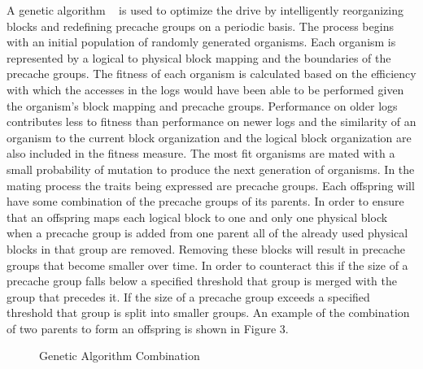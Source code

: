 \documentclass[letterpaper,twocolumn,10pt]{article}
\begin{document}
A genetic algorithm ~\cite{GeneticAlgorithm, GAlib} is used to optimize the drive by intelligently reorganizing blocks and redefining precache groups on a periodic basis.  The process begins with an initial population of randomly generated organisms.  Each organism is represented by a logical to physical block mapping and the boundaries of the precache groups.  The fitness of each organism is calculated based on the efficiency with which the accesses in the logs would have been able to be performed given the organism’s block mapping and precache groups.  Performance on older logs contributes less to fitness than performance on newer logs and the similarity of an organism to the current block organization and the logical block organization are also included in the fitness measure.  The most fit organisms are mated with a small probability of mutation to produce the next generation of organisms.  In the mating process the traits being expressed are precache groups.  Each offspring will have some combination of the precache groups of its parents.  In order to ensure that an offspring maps each logical block to one and only one physical block when a precache group is added from one parent all of the already used physical blocks in that group are removed.  Removing these blocks will result in precache groups that become smaller over time.  In order to counteract this if the size of a precache group falls below a specified threshold that group is merged with the group that precedes it.  If the size of a precache group exceeds a specified threshold that group is split into smaller groups.  An example of the combination of two parents to form an offspring is shown in Figure 3.

\begin{figure}[htb]
  \caption{Genetic Algorithm Combination}
\end{figure}
\end{document}
